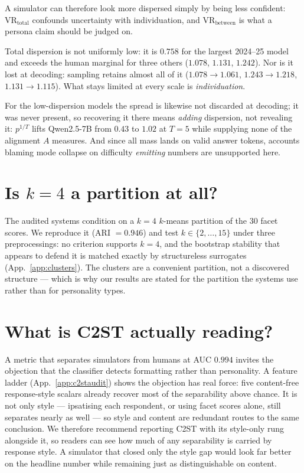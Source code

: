 \documentclass[11pt]{article}
\begin{document}
A simulator can therefore look more dispersed simply by being less confident:
$\mathrm{VR}_\text{total}$ confounds uncertainty with individuation, and
$\mathrm{VR}_\text{between}$ is what a persona claim should be judged on.

Total dispersion is not uniformly low: it is $0.758$ for the largest
2024--25 model and exceeds the human marginal for three others ($1.078$,
$1.131$, $1.242$). Nor is it lost at decoding: sampling retains almost all of
it ($1.078\!\to\!1.061$, $1.243\!\to\!1.218$, $1.131\!\to\!1.115$). What stays
limited at every scale is \emph{individuation}.

For the low-dispersion models the spread is likewise not discarded at
decoding; it was never present, so recovering it there means \emph{adding}
dispersion, not revealing it: $p^{1/T}$ lifts Qwen2.5-7B from
$0.43$ to $1.02$ at $T{=}5$ while supplying none of the alignment $A$ measures.
And since all mass lands on valid answer tokens, accounts blaming mode collapse
on difficulty \emph{emitting} numbers are unsupported here.


\section{Is \texorpdfstring{$k{=}4$}{k=4} a partition at all?}
\label{app:kfour}


The audited systems condition on a $k{=}4$ $k$-means partition of the 30 facet
scores. We reproduce it (ARI $=0.946$) and test $k\in\{2,\dots,15\}$ under three
preprocessings: no criterion supports $k{=}4$, and the bootstrap stability that
appears to defend it is matched exactly by structureless surrogates
(App.~\ref{app:clusters}). The clusters are a convenient partition, not a
discovered structure --- which is why our results are stated for the partition
the systems use rather than for personality types.


\section{What is C2ST actually reading?}
\label{app:c2streading}

\label{sec:c2st-audit}

A metric that separates simulators from humans at AUC $0.994$ invites the
objection that the classifier detects formatting rather than personality. A
feature ladder (App.~\ref{app:c2staudit}) shows the objection has real force:
five content-free response-style scalars already recover most of the separability
above chance. It is not only style --- ipsatising each respondent, or using facet
scores alone, still separates nearly as well --- so style and content are
redundant routes to the same conclusion. We therefore recommend reporting C2ST with its style-only rung alongside it, so
readers can see how much of any separability is carried by response style. A
simulator that closed only the style gap would look far better on the headline
number while remaining just as distinguishable on content.
\end{document}
